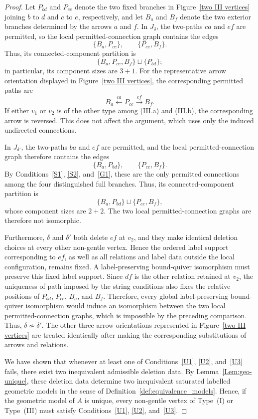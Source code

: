 \documentclass[11pt]{amsart}
\numberwithin{equation}{section}
\theoremstyle{definition}
\begin{document}
\begin{proof}
Let \(P_{bd}\) and \(P_{ce}\) denote the two fixed branches in
Figure~\ref{two III vertices} joining \(b\) to \(d\) and \(c\) to
\(e\), respectively, and let \(B_a\) and \(B_f\) denote the two
exterior branches determined by the arrows \(a\) and \(f\). In
\(J_{\delta}\), the two-paths \(ca\) and \(ef\) are permitted, so
the local permitted-connection graph contains the edges
\[
  \{B_a,P_{ce}\},
  \qquad
  \{P_{ce},B_f\}.
\]
Thus, its connected-component partition is
\[
  \bigl\{B_a,P_{ce},B_f\bigr\}
  \mathbin{\sqcup}
  \bigl\{P_{bd}\bigr\};
\]
in particular, its component sizes are \(3+1\). For the representative
arrow orientation displayed in Figure~\ref{two III vertices}, the
corresponding permitted paths are
\[
  B_a\xleftarrow{\,ca\,}P_{ce}
  \xrightarrow{\,ef\,}B_f.
\]
If either \(v_1\) or \(v_2\) is of the other type among
\textup{(III.a)} and \textup{(III.b)}, the corresponding arrow is
reversed. This does not affect the argument, which uses only the
induced undirected connections.

In \(J_{\delta'}\), the two-paths \(ba\) and \(ef\) are permitted,
and the local permitted-connection graph therefore contains the
edges
\[
  \{B_a,P_{bd}\},
  \qquad
  \{P_{ce},B_f\}.
\]
By Conditions~\ref{S1}, \ref{S2}, and~\ref{G1}, these are the only
permitted connections among the four distinguished full branches.
Thus, its connected-component partition is
\[
  \bigl\{B_a,P_{bd}\bigr\}
  \mathbin{\sqcup}
  \bigl\{P_{ce},B_f\bigr\},
\]
whose component sizes are \(2+2\). The two local
permitted-connection graphs are therefore not isomorphic.

Furthermore, \(\delta\) and \(\delta'\) both delete \(ef\) at
\(v_2\), and they make identical deletion choices at every other
non-gentle vertex. Hence the ordered label support corresponding to
\(ef\), as well as all relations and label data outside the local
configuration, remains fixed. A label-preserving bound-quiver
isomorphism must preserve this fixed label support. Since \(df\) is
the other relation retained at \(v_2\), the uniqueness of
path imposed by the string conditions also fixes the
relative positions of \(P_{bd}\), \(P_{ce}\), \(B_a\), and \(B_f\).
Therefore, every global label-preserving bound-quiver isomorphism
would induce an isomorphism between the two local
permitted-connection graphs, which is impossible by the preceding
comparison. Thus, $\delta\not\sim\delta'$.
The other three arrow orientations represented in
Figure~\ref{two III vertices} are treated identically after making
the corresponding substitutions of arrows and relations.

We have shown that whenever at least one of
Conditions~\ref{U1}, \ref{U2}, and~\ref{U3} fails, there exist two
inequivalent admissible deletion data. By
Lemma~\ref{Lem:geo-unique}, these deletion data determine two
inequivalent saturated  labelled geometric models in the
sense of Definition~\ref{def:equivalence_models}. Hence, if the
geometric model of \(A\) is unique, every non-gentle vertex of
Type~\textup{(I)} or Type~\textup{(III)} must satisfy
Conditions~\ref{U1}, \ref{U2}, and~\ref{U3}.
\end{proof}
\end{document}
